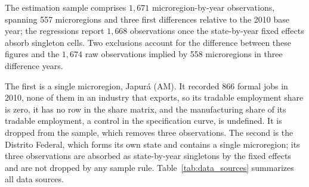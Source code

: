 \documentclass[
	11pt,				%
	oneside,			%
	a4paper,			%
	english,			%
	english				%
	]{abntex2ppgsi}
\theoremstyle{plain}
\theoremstyle{remark}
\theoremstyle{plain}%
\theoremstyle{remark}%
\begin{document}
The estimation sample comprises $1{,}671$ microregion-by-year observations,
spanning 557 microregions and three first differences relative to the 2010 base
year; the regressions report $1{,}668$ observations once the state-by-year fixed
effects absorb singleton cells. Two exclusions account for the difference
between these figures and the $1{,}674$ raw observations implied by 558
microregions in three difference years.

The first is a single microregion, Japurá (AM). It recorded 866 formal jobs in 2010, none of them in an industry that exports, so its tradable employment share is zero, it has no row in the share matrix, and the manufacturing share of its tradable employment, a control in the specification curve, is undefined. It is dropped from the sample, which removes three observations. The second is the Distrito Federal, which forms its own state and contains a single microregion; its three observations are absorbed as state-by-year singletons by the fixed effects and are not dropped by any sample rule.
Table~\ref{tab:data_sources} summarizes all data sources.
\end{document}
